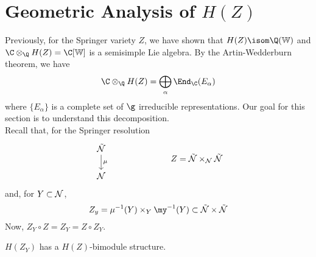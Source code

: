 \documentclass[springer-theory-notes.tex]{subfiles}
\begin{document}
\section{Geometric Analysis of \(H(Z)\)}
Previously, for the Springer variety \(Z\), we have shown that \(H(Z) \isom \Q(\W)\) and \(\C
\otimes_\Q H(Z) = \C[\W]\) is a semisimple Lie algebra. By the
Artin-Wedderburn theorem, we have \[
  \C \otimes_\Q H(Z) = \bigoplus_\alpha \End_\C(E_\alpha)
\]
where \(\{E_\alpha\}\) is a complete set of \(\g\) irreducible
representations. Our goal for this section is to understand this
decomposition. \\

Recall that, for the Springer resolution \[
  \begin{tikzcd}
    \tilde{\cN} \ar[d, "\mu"] \\
    \cN
  \end{tikzcd} \hspace{1in} Z = \tilde{\cN} \times_\cN \tilde{\cN}
\]
and, for \(Y \subset \mathcal{N}\), \[
  Z_y = \mu^{-1}(Y) \times_Y \my^{-1}(Y) \subset \tilde{\cN} \times \tilde{\cN}
\]
Now, \(Z_Y \circ Z = Z_Y = Z \circ Z_Y\).
\begin{prop}
  \(H(Z_Y)\) has a \(H(Z)\)-bimodule structure.
\end{prop}
\end{document}
